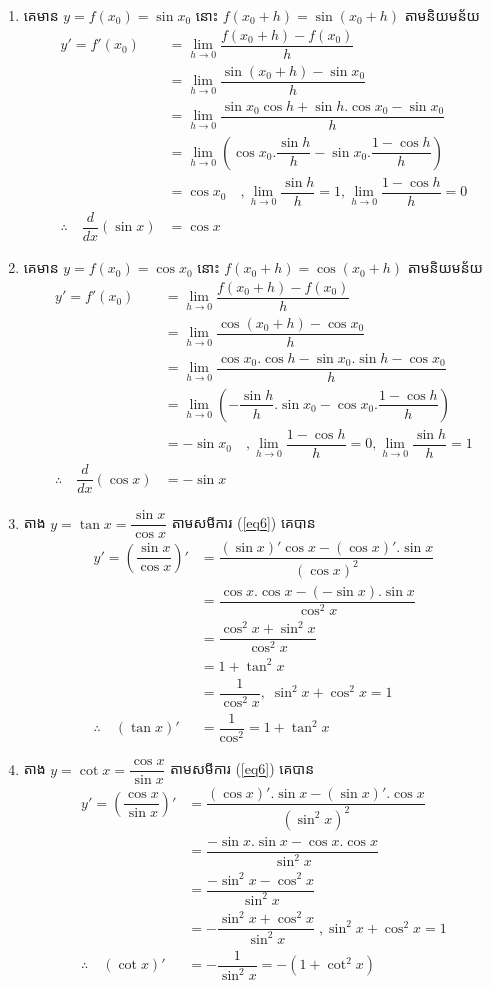 \documentclass[a4paper,12pt]{article}
\begin{document}
\begin{enumerate}
\item គេមាន $y=f(x_0)=\sin x_0$ នោះ $f(x_0+h)=\sin (x_0+h)$ តាមនិយមន័យ 
\begin{align*}
y'=f'(x_0)&=\lim_{h\to 0}\dfrac{f(x_0+h)-f(x_0)}{h}\\
&=\lim_{h\to 0}\dfrac{\sin (x_0+h)-\sin x_0}{h}\\
&=\lim_{h\to 0}\dfrac{\sin x_0\cos h+\sin h.\cos x_0 -\sin x_0}{h}\\
&=\lim_{h\to 0}\left(\cos x_0.\dfrac{\sin h}{h}-\sin x_0.\dfrac{1-\cos h}{h}  \right)\\
&=\cos x_0 \quad , \lim_{h\to 0}\dfrac{\sin h}{h}=1, \lim_{h\to 0}\dfrac{1-\cos h}{h}=0\\
\therefore \quad \dfrac{d}{dx}(\sin x)&=\cos x
\end{align*} 
\item គេមាន $y=f(x_0)=\cos x_0$ នោះ $f(x_0+h)=\cos (x_0+h)$ តាមនិយមន័យ
\begin{align*}
y'=f'(x_0)&=\lim_{h\to 0}\dfrac{f(x_0+h)-f(x_0)}{h}\\
&=\lim_{h\to 0}\dfrac{\cos (x_0+h)-\cos x_0}{h}\\
&=\lim_{h\to 0}\dfrac{\cos x_0.\cos h-\sin x_0 .\sin h-\cos x_0}{h}\\
&=\lim_{h\to 0}\left(-\dfrac{\sin h}{h}.\sin x_0-\cos x_0. \dfrac{1-\cos h}{h} \right)\\
&=-\sin x_0 \quad , \lim_{h\to 0}\dfrac{1-\cos h}{h}=0,\lim_{h\to 0}\dfrac{\sin h}{h}=1\\
\therefore\quad \dfrac{d}{dx}(\cos x)&=-\sin x
\end{align*}
\item តាង $y=\tan x=\dfrac{\sin x}{\cos x}$ តាមសមីការ (\ref{eq6}) គេបាន 
\begin{align*}
y'=\left(\dfrac{\sin x}{\cos x} \right)'&=\dfrac{(\sin x)'\cos x-(\cos x)'.\sin x}{(\cos x)^2}\\
&=\dfrac{\cos x.\cos x-(-\sin x).\sin x}{\cos^2 x}\\
&=\dfrac{\cos^2 x+\sin^2 x}{\cos^2 x}\\
&=1+\tan^2 x\\
&=\dfrac{1}{\cos^2 x} ,\; \sin^2 x+\cos^2 x=1\\
\therefore \quad (\tan x)'&=\dfrac{1}{\cos^2}=1+\tan^2 x
\end{align*}
\item តាង $y=\cot x=\dfrac{\cos x}{\sin x}$ តាមសមីការ (\ref{eq6}) គេបាន
\begin{align*}
y'=\left(\dfrac{\cos x}{\sin x} \right)'&=\dfrac{(\cos x)'.\sin x-(\sin x)'.\cos x}{(\sin^2x)^2}\\
&=\dfrac{-\sin x. \sin x-\cos x.\cos x}{\sin^2 x}\\
&=\dfrac{-\sin^2 x-\cos^2 x}{\sin^2 x}\\
&=-\dfrac{\sin^2 x+\cos^2 x}{\sin^2 x} \;, \sin^2 x+\cos^2 x=1\\
\therefore \quad (\cot x)'&=-\dfrac{1}{\sin^2 x}=-(1+\cot^2x) 
\end{align*}
\end{enumerate}
\end{document}
